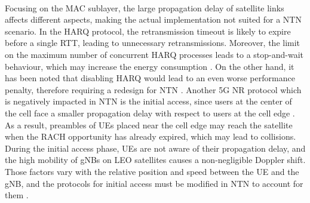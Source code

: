 \paragraph{} Focusing on the \ac{MAC} sublayer, the large propagation delay of satellite links affects different aspects, making the actual implementation not suited for a \ac{NTN} scenario. In the \ac{HARQ} protocol, the retransmission timeout is likely to expire before a single \ac{RTT}, leading to unnecessary retransmissions. Moreover, the limit on the maximum number of concurrent \ac{HARQ} processes leads to a stop-and-wait behaviour, which may increase the energy consumption \cite{3gpp-tr-38.811}. On the other hand, it has been noted that disabling \ac{HARQ} would lead to an even worse performance penalty, therefore requiring a redesign for \ac{NTN} \cite{5g-beyond-5g-ntn-trends-vanellicoralli}. Another 5G \ac{NR} protocol which is negatively impacted in \ac{NTN} is the initial access, since users at the center of the cell face a smaller propagation delay with respect to users at the cell edge \cite{5g-beyond-5g-ntn-trends-vanellicoralli} \cite{applying-nr-technologies-in-ntn-lee}. As a result, preambles of \ac{UE}s placed near the cell edge may reach the satellite when the \ac{RACH} opportunity has already expired, which may lead to collisions. During the initial access phase, \ac{UE}s are not aware of their propagation delay, and the high mobility of \ac{gNB}s on \ac{LEO} satellites causes a non-negligible Doppler shift. Those factors vary with the relative position and speed between the \ac{UE} and the \ac{gNB}, and the protocols for initial access must be modified in \ac{NTN} to account for them \cite{ntn-from-5g-6g-hassan}. 

